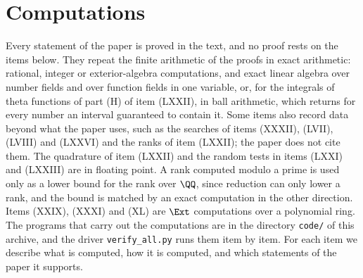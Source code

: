 \section{Computations}\label{sec:verification}

Every statement of the paper is proved in the text, and no proof rests on
the items below. They repeat the finite arithmetic of the proofs in exact
arithmetic: rational, integer or exterior-algebra computations, and exact
linear algebra over number fields and over function fields in one variable,
or, for the integrals of theta functions of part (H) of item (LXXII), in ball
arithmetic, which returns for every number an interval guaranteed to
contain it. Some items also record data beyond what the paper uses, such as
the searches of items (XXXII), (LVII), (LVIII) and (LXXVI) and the ranks of
item (LXXII); the paper does not cite them. The quadrature of item (LXXII)
and the random tests in items (LXXI) and (LXXIII) are in floating point. A rank computed modulo a prime is used only
as a lower bound for the rank over $\QQ$, since reduction can only lower a
rank, and the bound is matched by an exact computation in the other
direction. Items (XXIX), (XXXI) and (XL) are $\Ext$
computations over a polynomial ring. The programs that carry out the
computations are in the directory \texttt{code/} of this archive, and the driver
\texttt{verify\_all.py} runs them item by item. For each item we describe what is
computed, how it is computed, and which statements of the paper it supports.

